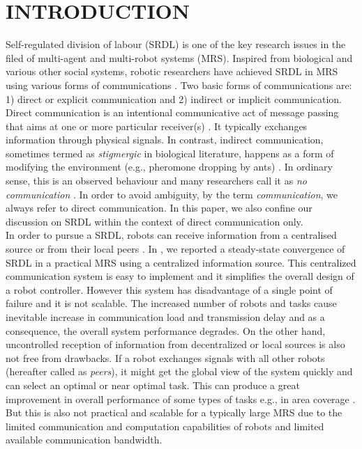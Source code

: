 \documentclass[letterpaper, 10 pt, conference]{ieeeconf}  %
\begin{document}
\section{INTRODUCTION}
\label{sec:intro}
Self-regulated division of labour (SRDL) is one of the key research issues in the filed of multi-agent and multi-robot systems (MRS). Inspired from biological and various other social systems, robotic researchers have achieved SRDL in MRS using various forms of communications \cite{Bonabeau+1999 - Labella}. Two basic forms of communications are: 1) direct or explicit communication and 2) indirect or implicit communication. Direct communication is an intentional communicative act of message passing that  aims at one or more particular receiver(s) \cite{Mataric}. It typically exchanges information  through physical signals. In contrast,  indirect communication, sometimes termed as {\em  stigmergic} in biological literature, happens as a form of modifying the environment (e.g., pheromone dropping by ants) \cite{Bonabeau+1999}.  In ordinary sense, this is an observed behaviour and many researchers call it as {\em no communication} \cite{Labella}. In order to avoid ambiguity, by the term {\em communication},  we always refer to direct communication. In this paper, we also confine our discussion on SRDL within the context of direct communication only.\\
In order to pursue a SRDL,  robots can receive information from a centralised source \cite{Krieger} or from their local peers \cite{Agassounon}. In \cite{Sarker}, we reported a steady-state convergence of SRDL in a practical MRS using a centralized information source.  This  centralized communication system  is easy to implement and it simplifies the overall design of  a robot controller. However this system has disadvantage of a single point of failure and it is not scalable. The increased number of robots and tasks cause  inevitable increase in communication load and  transmission delay and as a consequence, the overall system performance degrades.  On the other hand, uncontrolled reception of information from decentralized or local sources is also not  free from drawbacks. If a robot exchanges signals with all other robots (hereafter called as {\em peers}), it might get the global view of the system quickly and can select an optimal  or near optimal task. This can produce a great improvement in overall performance of some types of tasks e.g., in area coverage \cite{Rutishauser}. But this is  also not practical and scalable for a typically large MRS due to the limited communication and computation capabilities of robots and limited available communication bandwidth.\\ 
\end{document}
